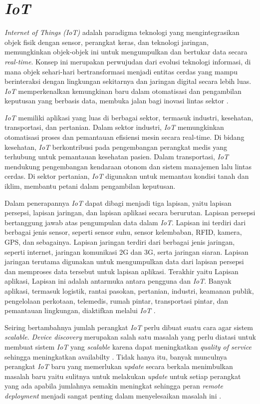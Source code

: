 \section{\textit{IoT}}

\textit{Internet of Things (IoT)} adalah paradigma teknologi yang mengintegrasikan objek fisik dengan sensor, perangkat keras, dan teknologi jaringan, memungkinkan objek-objek ini untuk mengumpulkan dan bertukar data secara \textit{real-time}. Konsep ini merupakan perwujudan dari evolusi teknologi informasi, di mana objek sehari-hari bertransformasi menjadi entitas cerdas yang mampu berinteraksi dengan lingkungan sekitarnya dan jaringan digital secara lebih luas. \textit{IoT} memperkenalkan kemungkinan baru dalam otomatisasi dan pengambilan keputusan yang berbasis data, membuka jalan bagi inovasi lintas sektor \parencite{madakam2015internet}.

\textit{IoT} memiliki aplikasi yang luas di berbagai sektor, termasuk industri, kesehatan, transportasi, dan pertanian. Dalam sektor industri, \textit{IoT} memungkinkan otomatisasi proses dan pemantauan efisiensi mesin secara real-time. Di bidang kesehatan, \textit{IoT} berkontribusi pada pengembangan perangkat medis yang terhubung untuk pemantauan kesehatan pasien. Dalam transportasi, \textit{IoT} mendukung pengembangan kendaraan otonom dan sistem manajemen lalu lintas cerdas. Di sektor pertanian, \textit{IoT} digunakan untuk memantau kondisi tanah dan iklim, membantu petani dalam pengambilan keputusan.

Dalam penerapannya \textit{IoT} dapat dibagi menjadi tiga lapisan, yaitu lapisan persepsi, lapisan jaringan, dan lapisan aplikasi secara berurutan. Lapisan persepsi bertanggung jawab atas pengumpulan data dalam \textit{IoT}. Lapisan ini terdiri dari berbagai jenis sensor, seperti sensor suhu, sensor kelembaban, RFID, kamera, GPS, dan sebagainya. Lapisan jaringan terdiri dari berbagai jenis jaringan, seperti internet, jaringan komunikasi 2G dan 3G, serta jaringan siaran. Lapisan jaringan terutama digunakan untuk mengumpulkan data dari lapisan persepsi dan memproses data tersebut untuk lapisan aplikasi. Terakhir yaitu Lapisan aplikasi, Lapisan ini adalah antarmuka antara pengguna dan \textit{IoT}. Banyak aplikasi, termasuk logistik, rantai pasokan, pertanian, industri, keamanan publik, pengelolaan perkotaan, telemedis, rumah pintar, transportasi pintar, dan pemantauan lingkungan, diaktifkan melalui \textit{IoT} \parencite{SmartHomeSystemBasedOnIoTTechnologies}.

Seiring bertambahnya jumlah perangkat \textit{IoT} perlu dibuat suatu cara agar sistem \textit{scalable}. \textit{Device discovery} merupakan salah satu masalah yang perlu diatasi untuk membuat sistem \textit{IoT} yang \textit{scalable} karena dapat meningkatkan \textit{quality of service} sehingga meningkatkan availabilty \parencite{DeviceDiscovery}. Tidak hanya itu, banyak munculnya perangkat \textit{IoT} baru yang memerlukan \textit{update} secara berkala menimbulkan masalah baru yaitu sulitnya untuk melakukan \textit{update} untuk setiap perangkat yang ada apabila jumlahnya semakin meningkat sehingga peran \textit{remote deployment} menjadi sangat penting dalam menyelesaikan masalah ini \parencite{RemoteDeployment}.